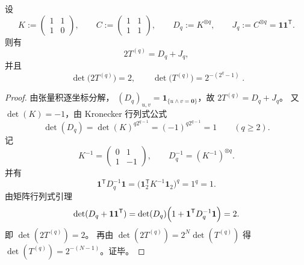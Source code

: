 \begin{conclusion}[行列式刚性：\texorpdfstring{$\det(2T^{(q)})=2$}{det(2T)=2}]\label{con:xi-terminal-disjointness-boolean-det-rigidity}
设
\[
K:=\begin{pmatrix}1&1\\[2pt]1&0\end{pmatrix},
\qquad
C:=\begin{pmatrix}1&1\\[2pt]1&1\end{pmatrix},
\qquad
D_q:=K^{\otimes q},
\qquad
J_q:=C^{\otimes q}=\mathbf 1\mathbf 1^{\mathsf T}.
\]
则有
\[
2T^{(q)}=D_q+J_q,
\]
并且
\[
\boxed{\;\det\!\bigl(2T^{(q)}\bigr)=2,\qquad
\det\!\bigl(T^{(q)}\bigr)=2^{-(2^q-1)}\; }.
\]
\end{conclusion}
\begin{proof}
由张量积逐坐标分解，
\(
(D_q)_{u,v}=\mathbf 1_{\{u\wedge v=\mathbf 0\}}
\)，故 \(2T^{(q)}=D_q+J_q\)。
又 \(\det(K)=-1\)，由 Kronecker 行列式公式
\[
\det(D_q)=\det(K)^{q2^{q-1}}=(-1)^{q2^{q-1}}=1
\qquad(q\ge 2).
\]
记
\[
K^{-1}=\begin{pmatrix}0&1\\[2pt]1&-1\end{pmatrix},
\qquad
D_q^{-1}=(K^{-1})^{\otimes q}.
\]
并有
\[
\mathbf 1^{\mathsf T}D_q^{-1}\mathbf 1
=\bigl(\mathbf 1_2^{\mathsf T}K^{-1}\mathbf 1_2\bigr)^q
=1^q=1.
\]
由矩阵行列式引理
\[
\det(D_q+\mathbf 1\mathbf 1^{\mathsf T})
=\det(D_q)\Bigl(1+\mathbf 1^{\mathsf T}D_q^{-1}\mathbf 1\Bigr)
=2.
\]
即 \(\det(2T^{(q)})=2\)。
再由 \(\det(2T^{(q)})=2^{N}\det(T^{(q)})\) 得
\(
\det(T^{(q)})=2^{-(N-1)}
\)。证毕。
\end{proof}

